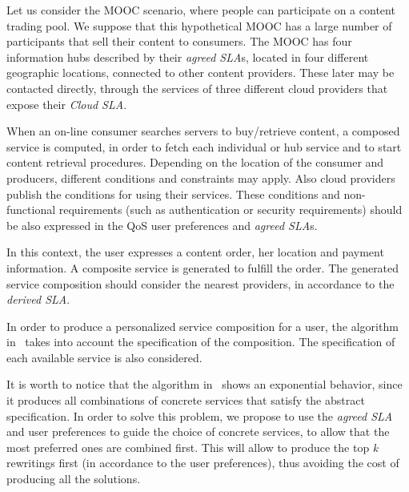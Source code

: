 \begin{example}\label{Ex:rew1}
Let us consider the MOOC scenario, where people can participate on a content trading pool.
We suppose that this hypothetical MOOC has a large number of participants that sell their content  to  consumers. 
The MOOC has four information hubs described by their {\em agreed SLA}s, located in four different geographic locations, connected to other content providers.
These later may be  contacted directly, through the services of three different cloud providers that expose their {\em Cloud SLA}.

When an on-line consumer searches servers to buy/retrieve content, a composed  service is computed, in order to fetch each individual or hub service and to start  content retrieval procedures.
Depending on the location of the consumer and producers, different conditions and constraints may apply.
Also  cloud providers  publish the conditions for using their services.
These conditions and non-functional requirements (such as authentication or security requirements) should  be also expressed in the QoS user preferences and {\em agreed SLA}s.

In this context, the user  expresses a content order, her location and payment information. A composite  service is  generated to fulfill the order.
The generated service composition should consider the nearest providers, in accordance to the {\em derived SLA}.

In order to produce a personalized service composition for a user, the algorithm in~\cite{CostaAMR13} takes into account the specification of the composition. The specification of each available service is also considered. 
\end{example}

It is worth to notice that the algorithm in~\cite{CostaAMR13} shows an exponential behavior, since it produces all combinations of concrete services that satisfy the abstract specification.
In order to solve this problem, we propose to use the \textit{agreed SLA} and user preferences to guide the choice of concrete services, to allow that the most preferred ones are combined first.
This will allow to produce the top \textit{k} rewritings first (in accordance to the user preferences), thus avoiding the cost of producing all the solutions.

